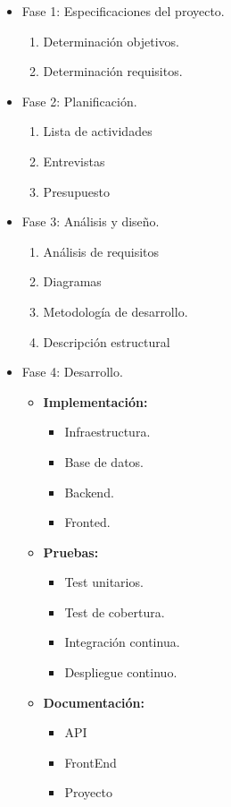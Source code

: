\begin{itemize}
  \item Fase 1: Especificaciones del proyecto.
    \begin{enumerate}
      \item Determinación objetivos.
      \item Determinación requisitos.
    \end{enumerate}
  \item Fase 2: Planificación.
    \begin{enumerate}
      \item Lista de actividades
      \item Entrevistas
      \item Presupuesto
    \end{enumerate}
  \item Fase 3: Análisis y diseño.
    \begin{enumerate}
      \item Análisis de requisitos
      \item Diagramas
      \item Metodología de desarrollo.
      \item Descripción estructural
    \end{enumerate}
  \item Fase 4: Desarrollo.
    \begin{itemize}
       \item \textbf{Implementación:} 
       \begin{itemize}
         \item  Infraestructura.
         \item  Base de datos.
         \item  Backend.
         \item  Fronted.
       \end{itemize}
       \item \textbf{Pruebas:} 
       \begin{itemize}
        \item  Test unitarios.
        \item  Test de cobertura.
        \item  Integración continua.
        \item  Despliegue continuo.
       \end{itemize}
       \item \textbf{Documentación:} 
       \begin{itemize}
        \item  API
        \item  FrontEnd
        \item  Proyecto
       \end{itemize}
    \end{itemize}
\end{itemize}


